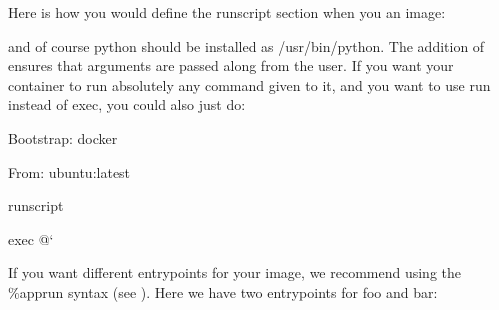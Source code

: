 \documentclass[letterpaper,10pt,english]{sphinxmanual}
\begin{document}
Here is how you would define the runscript section when you  an image:

%
\begin{sphinxVerbatim}[commandchars=\\\{\}]
 

 



  
\end{sphinxVerbatim}

and of course python should be installed as /usr/bin/python. The
addition of  ensures that arguments are passed along from the user. If
you want your container to run absolutely any command given to it, and
you want to use run instead of exec, you could also just do:

%
\begin{sphinxVerbatim}[commandchars=\\\{\}]
Bootstrap: docker

From: ubuntu:latest


\PYGZpc{}runscript

exec \PYGZdq{}\PYGZdl{}@\PYGZdq{}{}`
\end{sphinxVerbatim}

If you want different entrypoints for your image, we recommend using the
\%apprun syntax (see ). Here we have two entrypoints for foo and bar:

%
\begin{sphinxVerbatim}[commandchars=\\\{\}]

  


 

      


 

      
\end{sphinxVerbatim}
\end{document}
